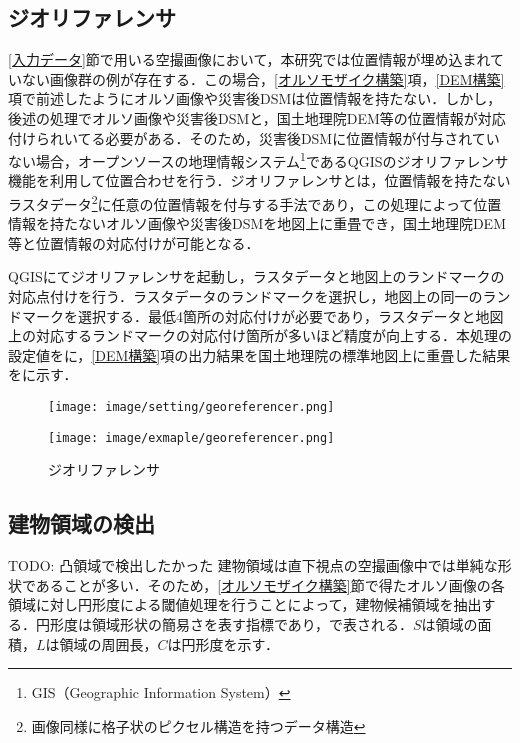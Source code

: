     \subsection{ジオリファレンサ}
      \ref{入力データ}節で用いる空撮画像において，本研究では位置情報が埋め込まれていない画像群の例が存在する．この場合，\ref{オルソモザイク構築}項，\ref{DEM構築}項で前述したようにオルソ画像や災害後DSMは位置情報を持たない．しかし，後述の処理でオルソ画像や災害後DSMと，国土地理院DEM等の位置情報が対応付けられいてる必要がある．そのため，災害後DSMに位置情報が付与されていない場合，オープンソースの地理情報システム\footnote{GIS（Geographic Information System）}であるQGIS\cite{QGIS}のジオリファレンサ機能を利用して位置合わせを行う．ジオリファレンサとは，位置情報を持たないラスタデータ\footnote{画像同様に格子状のピクセル構造を持つデータ構造}に任意の位置情報を付与する手法であり，この処理によって位置情報を持たないオルソ画像や災害後DSMを地図上に重畳でき，国土地理院DEM等と位置情報の対応付けが可能となる．

      QGISにてジオリファレンサを起動し，ラスタデータと地図上のランドマークの対応点付けを行う．ラスタデータのランドマークを選択し，地図上の同一のランドマークを選択する．最低4箇所の対応付けが必要であり，ラスタデータと地図上の対応するランドマークの対応付け箇所が多いほど精度が向上する．本処理の設定値をに，\ref{DEM構築}項の出力結果を国土地理院の標準地図\cite{標準地図}上に重畳した結果をに示す．

      \begin{figure}[t]
        \begin{minipage}[c]{0.45\hsize}
          \centering
          \texttt{[image: image/setting/georeferencer.png]}
          \label{ジオリファレンサ設定値}
        \end{minipage}
        \begin{minipage}[c]{0.45\hsize}
          \centering
          \texttt{[image: image/exmaple/georeferencer.png]}
          \label{ジオリファレンサ結果}
        \end{minipage}
        \caption{ジオリファレンサ}
      \end{figure}

    \subsection{建物領域の検出}
      \label{建物領域の検出}
      TODO: 凸領域で検出したかった
      建物領域は直下視点の空撮画像中では単純な形状であることが多い．そのため，\ref{オルソモザイク構築}節で得たオルソ画像の各領域に対し円形度による閾値処理を行うことによって，建物候補領域を抽出する．円形度は領域形状の簡易さを表す指標であり，で表される．$S$は領域の面積，$L$は領域の周囲長，$C$は円形度を示す．

